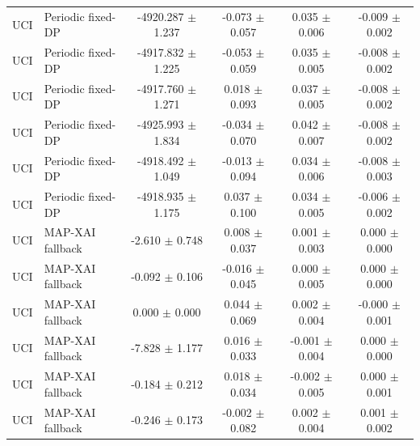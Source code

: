 \begin{table}[t]
\begin{tabular}{llcccc}
UCI & Periodic fixed-DP & -4920.287 $\pm$ 1.237 & -0.073 $\pm$ 0.057 & 0.035 $\pm$ 0.006 & -0.009 $\pm$ 0.002 \\
UCI & Periodic fixed-DP & -4917.832 $\pm$ 1.225 & -0.053 $\pm$ 0.059 & 0.035 $\pm$ 0.005 & -0.008 $\pm$ 0.002 \\
UCI & Periodic fixed-DP & -4917.760 $\pm$ 1.271 & 0.018 $\pm$ 0.093 & 0.037 $\pm$ 0.005 & -0.008 $\pm$ 0.002 \\
UCI & Periodic fixed-DP & -4925.993 $\pm$ 1.834 & -0.034 $\pm$ 0.070 & 0.042 $\pm$ 0.007 & -0.008 $\pm$ 0.002 \\
UCI & Periodic fixed-DP & -4918.492 $\pm$ 1.049 & -0.013 $\pm$ 0.094 & 0.034 $\pm$ 0.006 & -0.008 $\pm$ 0.003 \\
UCI & Periodic fixed-DP & -4918.935 $\pm$ 1.175 & 0.037 $\pm$ 0.100 & 0.034 $\pm$ 0.005 & -0.006 $\pm$ 0.002 \\
UCI & MAP-XAI fallback & -2.610 $\pm$ 0.748 & 0.008 $\pm$ 0.037 & 0.001 $\pm$ 0.003 & 0.000 $\pm$ 0.000 \\
UCI & MAP-XAI fallback & -0.092 $\pm$ 0.106 & -0.016 $\pm$ 0.045 & 0.000 $\pm$ 0.005 & 0.000 $\pm$ 0.000 \\
UCI & MAP-XAI fallback & 0.000 $\pm$ 0.000 & 0.044 $\pm$ 0.069 & 0.002 $\pm$ 0.004 & -0.000 $\pm$ 0.001 \\
UCI & MAP-XAI fallback & -7.828 $\pm$ 1.177 & 0.016 $\pm$ 0.033 & -0.001 $\pm$ 0.004 & 0.000 $\pm$ 0.000 \\
UCI & MAP-XAI fallback & -0.184 $\pm$ 0.212 & 0.018 $\pm$ 0.034 & -0.002 $\pm$ 0.005 & 0.000 $\pm$ 0.001 \\
UCI & MAP-XAI fallback & -0.246 $\pm$ 0.173 & -0.002 $\pm$ 0.082 & 0.002 $\pm$ 0.004 & 0.001 $\pm$ 0.002 \\
\bottomrule
\end{tabular}
\end{table}
